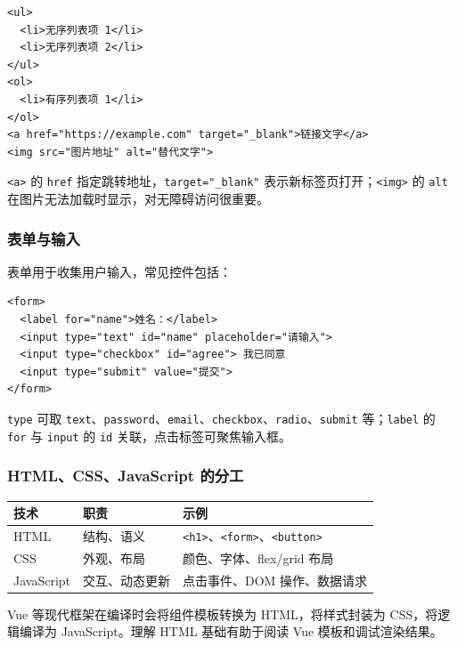 \documentclass[11pt]{article}
\begin{document}
\begin{lstlisting}[caption=列表、链接与图片示例]
<ul>
  <li>无序列表项 1</li>
  <li>无序列表项 2</li>
</ul>
<ol>
  <li>有序列表项 1</li>
</ol>
<a href="https://example.com" target="_blank">链接文字</a>
<img src="图片地址" alt="替代文字">
\end{lstlisting}

\texttt{<a>} 的 \texttt{href} 指定跳转地址，\texttt{target="\_blank"} 表示新标签页打开；\texttt{<img>} 的 \texttt{alt} 在图片无法加载时显示，对无障碍访问很重要。

\subsubsection{表单与输入}

表单用于收集用户输入，常见控件包括：

\begin{lstlisting}[caption=表单输入示例]
<form>
  <label for="name">姓名：</label>
  <input type="text" id="name" placeholder="请输入">
  <input type="checkbox" id="agree"> 我已同意
  <input type="submit" value="提交">
</form>
\end{lstlisting}

\texttt{type} 可取 \texttt{text}、\texttt{password}、\texttt{email}、\texttt{checkbox}、\texttt{radio}、\texttt{submit} 等；\texttt{label} 的 \texttt{for} 与 \texttt{input} 的 \texttt{id} 关联，点击标签可聚焦输入框。

\subsubsection{HTML、CSS、JavaScript 的分工}

\begin{center}
\begin{tabular}{|l|l|l|}
\hline
\textbf{技术} & \textbf{职责} & \textbf{示例} \\
\hline
HTML & 结构、语义 & \texttt{<h1>}、\texttt{<form>}、\texttt{<button>} \\
CSS & 外观、布局 & 颜色、字体、flex/grid 布局 \\
JavaScript & 交互、动态更新 & 点击事件、DOM 操作、数据请求 \\
\hline
\end{tabular}
\end{center}

Vue 等现代框架在编译时会将组件模板转换为 HTML，将样式封装为 CSS，将逻辑编译为 JavaScript。理解 HTML 基础有助于阅读 Vue 模板和调试渲染结果。
\end{document}
